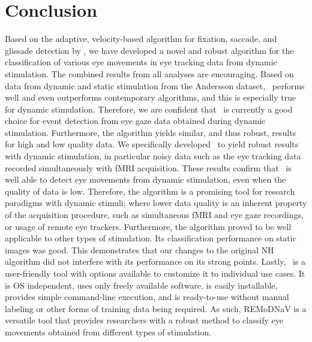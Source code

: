 \section*{Conclusion}\label{con}

Based on the adaptive, velocity-based algorithm for fixation, saccade, and
glissade detection by \cite{Nystrom2010AnData}, we have developed a novel and
robust algorithm for the classification of various eye movements in eye
tracking data from dynamic stimulation.  The combined results from all analyses
are encouraging. Based on data from dynamic and static stimulation from the
Andersson dataset, \remodnav\ performs well and even outperforms contemporary
algorithms, and this is especially true for dynamic stimulation. Therefore, we
are confident that \remodnav\ is currently a good choice for event detection
from eye gaze data obtained during dynamic stimulation.  Furthermore, the
algorithm yields similar, and thus robust, results for high and low quality
data. We specifically developed \remodnav\ to yield robust results with dynamic
stimulation, in particular noisy data such as the eye tracking data recorded
simultaneously with fMRI acquisition. These results confirm that \remodnav\ is
well able to detect eye movements from dynamic stimulation, even when the
quality of data is low. Therefore, the algorithm is a promising tool for
research paradigms with dynamic stimuli; where lower data quality is an inherent
property of the acquisition procedure, such as simultaneous fMRI and eye gaze
recordings, or usage of remote eye trackers.  Furthermore, the algorithm proved
to be well applicable to other types of stimulation. Its classification
performance on static images was good. This demonstrates that our changes to
the original NH algorithm did not interfere with its performance on its strong
points. Lastly, \remodnav\ is a user-friendly tool with options available to customize
it to individual use cases. It is OS independent, uses only freely available
software, is easily installable, provides simple command-line execution, and is
ready-to-use without manual labeling or other forms of training data being
required. As such, REMoDNaV is a versatile tool that provides researchers with
a robust method to classify eye movements obtained from different types of
stimulation.

